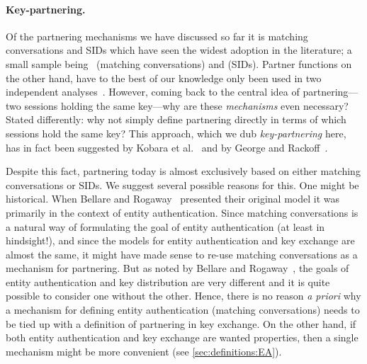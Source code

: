 \paragraph{Key-partnering.}
Of the partnering mechanisms we have discussed so far
it is matching conversations and SIDs which have seen the widest adoption in the literature;
a small sample being~\cite{C:BelRog93,Blake-WilsonM:1997:BR93_asymmetric,C:Krawczyk05,PKC:LauMit06,ASIACCS:MenUst08,ESORICS:CreFel12,C:JKSS12,CCS:BDKSS14,Cohn-GordonCG:2016:post-compromise} (matching conversations)
and \cite{EC:BelPoiRog00,EC:CanKra01,C:CanKra02,ACNS:JeoKatLee04,PKC:AbdFouPoi05,RogawayS:2009:elision,CCS:BFWW11,BrzuskaFSWW:2012:less_is_more,CCS:BSWW13,C:KraPatWee13,CCS:FisGue14,CCS:DFGS15} (SIDs).
Partner functions on the other hand,
have to the best of our knowledge only been used in two independent analyses~\cite{STOC:BelRog95,EC:ShoRub96}.
However,
coming back to the central idea of partnering---two sessions holding the same key---why are these \emph{mechanisms} even necessary?
Stated differently:
why not simply define partnering directly in terms of which sessions hold the same key?
This approach,
which we dub \emph{key-partnering} here,
has in fact been suggested by  Kobara et al.~\cite{ASIACCS:KobShiStr09} and by George and Rackoff~\cite{EPRINT:GeoRac13}.

Despite this fact,
partnering today is almost exclusively based on either matching conversations or SIDs.  
We suggest several possible reasons for this.
One might be historical.
When Bellare and Rogaway~\cite{C:BelRog93} presented their original model it was primarily in the context of entity authentication.
Since matching conversations is a natural way of formulating the goal of entity authentication 
(at least in hindsight!),
and since the models for entity authentication and key exchange are almost the same,
it might have made sense to re-use matching conversations as a mechanism for partnering.
But as noted by Bellare and Rogaway~\cite{STOC:BelRog95},
the goals of entity authentication and key distribution are very different and it is quite possible to consider one without the other.
Hence,
there is no reason \emph{a priori} why a mechanism for defining entity authentication 
(matching conversations) needs to be tied up with a definition of partnering in key exchange.
On the other hand,
if both entity authentication and key exchange are wanted properties,
then a single mechanism might be more convenient
(see \cref{sec:definitions:EA}).


